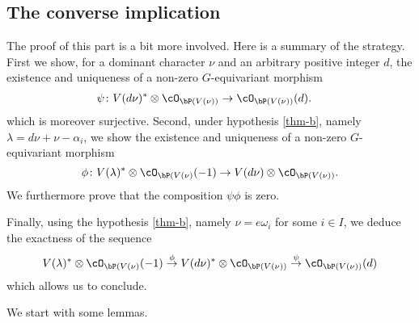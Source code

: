\documentclass[reqno, 10pt]{amsart}
\theoremstyle{plain}
\theoremstyle{definition}
\numberwithin{equation}{section}%
\begin{document}
\subsection{The converse implication}
The proof of this part is a bit more involved.
Here is a summary of the strategy.
First we show, for a dominant character $\nu$ and an arbitrary positive integer $d$, the existence and uniqueness of a non-zero $G$-equivariant morphism
\begin{align*}
\psi\colon V(d\nu)^*\otimes \cO_{\bP(V(\nu))}&\to \cO_{\bP(V(\nu))}(d).
\end{align*}
which is moreover surjective.
Second, under hypothesis \ref{thm-b}, namely $\lambda=d\nu+\nu-\alpha_i$, we show the existence and uniqueness of a non-zero $G$-equivariant morphism
\[\phi\colon V(\lambda)^*\otimes \cO_{\bP(V(\nu)}(-1) \to V(d\nu)\otimes \cO_{\bP(V(\nu))}.\]
We furthermore prove that the composition $\psi\phi$ is zero.

Finally, using the hypothesis \ref{thm-b}, namely $\nu=e\omega_i$ for some $i\in I$, we deduce the exactness of the sequence
\begin{equation*}
	V(\lambda)^*\otimes \cO_{\bP(V(\nu)}(-1)\stackrel{\phi}\to V(d\nu)^*\otimes \cO_{\bP(V(\nu))} \stackrel{\psi}\to \cO_{\bP(V(\nu))}(d) 
\end{equation*}
which allows us to conclude.
\medskip

We start with some lemmas. 
\end{document}
